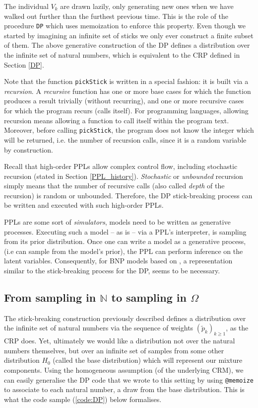 The individual $V_k$ are drawn lazily, only generating new ones when we have walked out further than the furthest previous time. This is the role of the procedure \texttt{DP} which uses memoization to enforce this property. Even though we started by imagining an infinite set of sticks we only ever construct a finite subset of them. The above generative construction of the \gls{DP} defines a distribution over the infinite set of natural numbers, which is equivalent to the \gls{CRP} defined in Section \ref{DP}.

Note that the function \texttt{pickStick} is written in a special fashion: it is built via a \textit{recursion}. A \textit{recursive} function has one or more base cases for which the function produces a result trivially (without recurring), and one or more recursive cases for which the program recurs (calls itself). For programming languages, allowing recursion means allowing a function to call itself within the program text. Moreover, before calling \texttt{pickStick}, the program does not know the integer which will be returned, i.e. the number of recursion calls, since it is a random variable by construction.

Recall that high-order \glspl{PPL} allow complex control flow, including stochastic recursion (stated in Section \ref{PPL_history}). \textit{Stochastic} or \textit{unbounded} recursion simply means that the number of recursive calls (also called \textit{depth} of the recursion) is random or unbounded. Therefore, the \gls{DP} stick-breaking process can be written and executed with such high-order \glspl{PPL}.

\glspl{PPL} are some sort of \textit{simulators}, models need to be written as generative processes. Executing such a model -- as is -- via a \gls{PPL}'s interpreter, is sampling from its prior distribution. Once one can write a model as a generative process, (i.e can sample from the model's prior), the \gls{PPL} can perform inference on the latent variables. Consequently, for \gls{BNP} models based on , a representation similar to the stick-breaking process for the \gls{DP}, seems to be necessary.

\subsection{From sampling in $\mathbb{N}$ to sampling in $\Omega$}
The stick-breaking construction previously described defines a distribution over the infinite set of natural numbers via the sequence of weights $(\tilde{p}_k)_{k \ge 1}$, as the \gls{CRP} does. Yet, ultimately we would like a distribution not over the natural numbers themselves, but over an infinite set of samples from some other distribution $H_0$ (called the base distribution) which will represent our mixture components. Using the homogeneous assumption (of the underlying \gls{CRM}), we can easily generalise the \gls{DP} code that we wrote to this setting by using \texttt{@memoize} to associate to each natural number, a draw from the base distribution.
This is what the code sample (\ref{code:DP}) below formalises.

